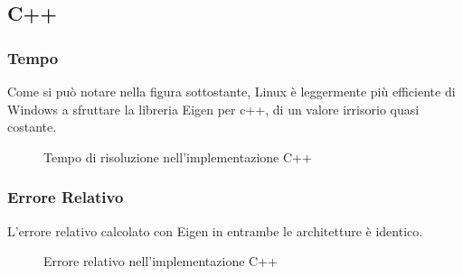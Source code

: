 \documentclass[11pt,italian]{article}
\begin{document}
\subsection{C++}
\subsubsection*{Tempo}
Come si può notare nella figura sottostante, Linux è leggermente più efficiente di Windows a sfruttare la libreria Eigen per c++, di un valore irrisorio quasi costante.
\begin{figure}[H]
    \caption{Tempo di risoluzione nell'implementazione C++}
    \label{fig:cpp-time}
\end{figure}

\subsubsection*{Errore Relativo}
L'errore relativo calcolato con Eigen in entrambe le architetture è identico.
\begin{figure}[H]
    \caption{Errore relativo nell'implementazione C++}
    \label{fig:cpp-error}
\end{figure}
\end{document}

